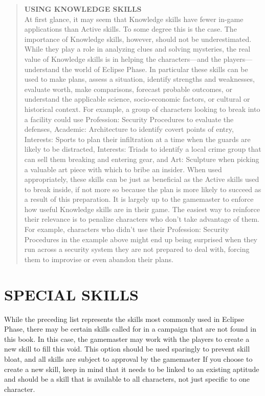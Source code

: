 \begin{quotation}
\textbf{USING KNOWLEDGE SKILLS}
\\
At first glance, it may seem that Knowledge skills have
fewer in-game applications than Active skills. To some
degree this is the case. The importance of Knowledge
skills, however, should not be underestimated. While
they play a role in analyzing clues and solving mysteries, the real value of Knowledge skills is in helping the
characters—and the players—understand the world of
Eclipse Phase. In particular these skills can be used to
make plans, assess a situation, identify strengths and
weaknesses, evaluate worth, make comparisons, forecast
probable outcomes, or understand the applicable science,
socio-economic factors, or cultural or historical context.
   For example, a group of characters looking to break
into a facility could use Profession: Security Procedures
to evaluate the defenses, Academic: Architecture to
identify covert points of entry, Interests: Sports to plan
their infiltration at a time when the guards are likely to
be distracted, Interests: Triads to identify a local crime
group that can sell them breaking and entering gear,
and Art: Sculpture when picking a valuable art piece
with which to bribe an insider. When used appropriately,
these skills can be just as beneficial as the Active skills
used to break inside, if not more so because the plan
is more likely to succeed as a result of this preparation.
   It is largely up to the gamemaster to enforce how
useful Knowledge skills are in their game. The easiest
way to reinforce their relevance is to penalize characters who don’t take advantage of them. For example,
characters who didn’t use their Profession: Security
Procedures in the example above might end up being
surprised when they run across a security system they
are not prepared to deal with, forcing them to improvise or even abandon their plans.
\end{quotation}

\section{SPECIAL SKILLS}
While the preceding list represents the skills most commonly
used in Eclipse Phase, there may be certain skills called for in a
campaign that are not found in this book. In this case, the gamemaster
may work with the players to create a new skill to fill
this void. This option should be used sparingly to prevent skill
bloat, and all skills are subject to approval by the gamemaster
If you choose to create a new skill, keep in mind that it needs
to be linked to an existing aptitude and should be a skill that
is available to all characters, not just specific to one character.










